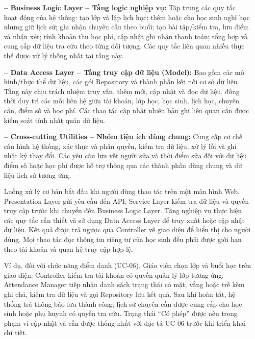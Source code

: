 \begin{samepage}
\noindent\hspace*{0.65em}\textbf{– Business Logic Layer – Tầng logic nghiệp vụ: }Tập trung các quy tắc hoạt động của hệ thống: tạo lớp và lập lịch học; thêm hoặc cho học sinh nghỉ học nhưng giữ lịch sử; ghi nhận chuyên cần theo buổi; tạo bài tập/kiểm tra, lưu điểm và nhận xét; tính khoản thu học phí, cập nhật ghi nhận thanh toán; tổng hợp và cung cấp dữ liệu tra cứu theo từng đối tượng. Các quy tắc liên quan nhiều thực thể được xử lý thống nhất tại tầng này.\par
\end{samepage}

\begin{samepage}
\noindent\hspace*{0.65em}\textbf{– Data Access Layer – Tầng truy cập dữ liệu (Model): }Bao gồm các mô hình/thực thể dữ liệu, các gói Repository và thành phần kết nối cơ sở dữ liệu. Tầng này chịu trách nhiệm truy vấn, thêm mới, cập nhật và đọc dữ liệu, đồng thời duy trì các mối liên hệ giữa tài khoản, lớp học, học sinh, lịch học, chuyên cần, điểm số và học phí. Các thao tác cập nhật nhiều bản ghi liên quan cần được kiểm soát tính nhất quán dữ liệu.\par
\end{samepage}

\begin{samepage}
\noindent\hspace*{0.65em}\textbf{– Cross-cutting Utilities – Nhóm tiện ích dùng chung: }Cung cấp cơ chế cấu hình hệ thống, xác thực và phân quyền, kiểm tra dữ liệu, xử lý lỗi và ghi nhật ký thay đổi. Các yêu cầu lưu vết người sửa và thời điểm sửa đối với dữ liệu điểm số hoặc học phí được hỗ trợ thông qua các thành phần dùng chung và dữ liệu lịch sử tương ứng.\par
\end{samepage}

Luồng xử lý cơ bản bắt đầu khi người dùng thao tác trên một màn hình Web. Presentation Layer gửi yêu cầu đến API; Service Layer kiểm tra dữ liệu và quyền truy cập trước khi chuyển đến Business Logic Layer. Tầng nghiệp vụ thực hiện các quy tắc cần thiết và sử dụng Data Access Layer để truy xuất hoặc cập nhật dữ liệu. Kết quả được trả ngược qua Controller về giao diện để hiển thị cho người dùng. Mọi thao tác đọc thông tin riêng tư của học sinh đều phải được giới hạn theo tài khoản và quan hệ truy cập hợp lệ.\par

Ví dụ, đối với chức năng điểm danh (UC-06), Giáo viên chọn lớp và buổi học trên giao diện. Controller kiểm tra tài khoản có quyền quản lý lớp tương ứng; Attendance Manager tiếp nhận danh sách trạng thái có mặt, vắng hoặc trễ kèm ghi chú, kiểm tra dữ liệu và gọi Repository lưu kết quả. Sau khi hoàn tất, hệ thống trả thông báo lưu thành công; lịch sử chuyên cần được cung cấp cho học sinh hoặc phụ huynh có quyền tra cứu. Trạng thái “Có phép” được nêu trong phạm vi cập nhật và cần được thống nhất với đặc tả UC-06 trước khi triển khai chi tiết.\par

